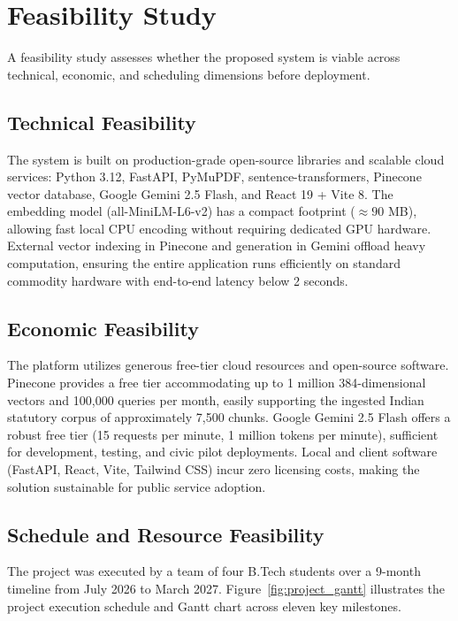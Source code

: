 \documentclass[12pt,a4paper]{report}
\begin{document}
\chapter{Feasibility Study}

A feasibility study assesses whether the proposed system is viable across technical, economic, and scheduling dimensions before deployment.

\section{Technical Feasibility}
The system is built on production-grade open-source libraries and scalable cloud services: Python 3.12, FastAPI, PyMuPDF, sentence-transformers, Pinecone vector database, Google Gemini 2.5 Flash, and React 19 + Vite 8. The embedding model (all-MiniLM-L6-v2) has a compact footprint ($\approx 90$ MB), allowing fast local CPU encoding without requiring dedicated GPU hardware. External vector indexing in Pinecone and generation in Gemini offload heavy computation, ensuring the entire application runs efficiently on standard commodity hardware with end-to-end latency below 2 seconds.

\section{Economic Feasibility}
The platform utilizes generous free-tier cloud resources and open-source software. Pinecone provides a free tier accommodating up to 1 million 384-dimensional vectors and 100,000 queries per month, easily supporting the ingested Indian statutory corpus of approximately 7,500 chunks. Google Gemini 2.5 Flash offers a robust free tier (15 requests per minute, 1 million tokens per minute), sufficient for development, testing, and civic pilot deployments. Local and client software (FastAPI, React, Vite, Tailwind CSS) incur zero licensing costs, making the solution sustainable for public service adoption.

\section{Schedule and Resource Feasibility}
The project was executed by a team of four B.Tech students over a 9-month timeline from July 2026 to March 2027. Figure~\ref{fig:project_gantt} illustrates the project execution schedule and Gantt chart across eleven key milestones.
\end{document}
